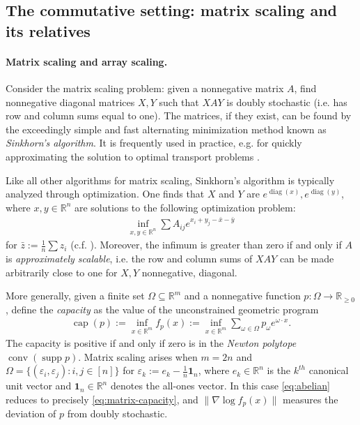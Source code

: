 \documentclass[10pt,a4paper]{article}
\numberwithin{equation}{section}
\DeclareMathOperator{\diag}{diag}
\DeclareMathOperator{\conv}{conv}
\DeclareMathOperator{\capa}{cap}
\DeclareMathOperator{\supp}{supp}
\newcommand{\RR}{\mathbb R}
\newcommand{\eps}{\varepsilon}
\newcommand{\id}{\mathbf{1}}
\begin{document}
\subsection{The commutative setting: matrix scaling and its relatives}


\paragraph{Matrix scaling and array scaling.}

Consider the matrix scaling problem: given a nonnegative matrix $A$, find nonnegative diagonal matrices $X, Y$ such that $XA Y$ is doubly stochastic (i.e. has row and column sums equal to one). The matrices, if they exist, can be found by the exceedingly simple and fast alternating minimization method known as \emph{Sinkhorn's algorithm}. It is frequently used in practice, e.g. for quickly approximating the solution to optimal transport problems \cite{cuturi2013sinkhorn}.

Like all other algorithms for matrix scaling,  Sinkhorn's algorithm is typically analyzed through optimization. One finds that $X$ and $Y$ are $e^{\diag(x)}, e^{\diag(y)}$, where $x,y \in \RR^n$ are solutions to the following optimization problem: 
\begin{align}\inf_{x, y \in \RR^n} \sum A_{ij}e^{x_i + y_j - \bar{x} - \bar{y}}\label{eq:matrix-capacity}\end{align}
for $\bar{z}:=\frac{1}{n} \sum z_i$ (c.f. \cite{kalantari1996complexity}). Moreover, the infimum is greater than zero if and only if $A$ is \emph{approximately scalable}, i.e. the row and column sums of $XAY$ can be made arbitrarily close to one for $X, Y$ nonnegative, diagonal.


More generally, given a finite set $\Omega \subseteq \RR^m$ and a nonnegative function $p:\Omega \to \RR_{\geq 0}$, define the \emph{capacity} \cite{gurvits2004combinatorial} as the value of the unconstrained geometric program
\begin{gather}
\capa(p):= \inf_{x \in \RR^m} f_p(x) := \inf_{x \in \RR^m} \sum_{\omega \in \Omega} p_\omega e^{\omega \cdot x}.\label{eq:abelian}
\end{gather}
The capacity is positive if and only if zero is in the \emph{Newton polytope} $\conv(\supp p)$. Matrix scaling arises when $m = 2n$ and $\Omega = \{(\eps_i, \eps_j): i,j \in [n]\}$ for $\eps_k:=e_k - \frac{1}{n} \id_n$, where $e_k \in \RR^n$ is the $k^{th}$ canonical unit vector and $\id_n \in \RR^n$ denotes the all-ones vector. In this case \cref{eq:abelian} reduces to precisely \cref{eq:matrix-capacity}, and $\|\nabla \log f_p (x)\|$ measures the deviation of $p$ from doubly stochastic.
\end{document}
